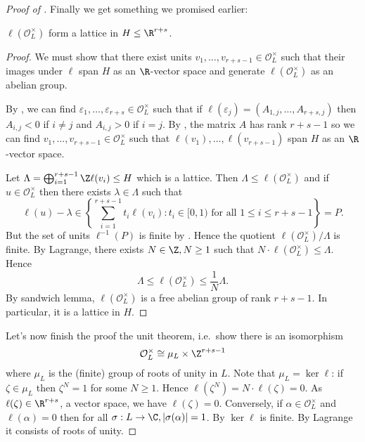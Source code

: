 \documentclass[a4paper]{article}
\renewcommand*{\O}{\mathcal{O}}
\begin{document}
\begin{proof}[Proof of ]
  Finally we get something we promised earlier:

  \begin{proposition}
    \(\ell(\O_L^\times)\) form a lattice in \(H \leq \R^{r + s}\).
  \end{proposition}

  \begin{proof}
    We must show that there exist units \(v_1, \dots, v_{r + s - 1} \in \O_L^\times\) such that their images under \(\ell\) span \(H\) as an \(\R\)-vector space and generate \(\ell(\O_L^\times)\) as an abelian group.

    By , we can find \(\varepsilon_1, \dots, \varepsilon_{r + s} \in \O_L^\times\) such that if \(\ell(\varepsilon_j) = (A_{1, j}, \dots, A_{r + s, j})\) then \(A_{i, j} < 0\) if \(i \neq j\) and \(A_{i, j} > 0\) if \(i = j\). By , the matrix \(A\) has rank \(r + s - 1\) so we can find \(v_1, \dots, v_{r + s - 1} \in \O_L^\times\) such that \(\ell(v_1), \dots, \ell(v_{r + s - 1})\) span \(H\) as an \(\R\)-vector space.

    Let \(\Lambda = \bigoplus_{i = 1}^{r + s - 1} \Z \ell(v_i) \leq H\) which is a lattice. Then \(\Lambda \leq \ell(\O_L^\times)\) and if \(u \in \O_L^\times\) then there exists \(\lambda \in \Lambda\) such that
    \[
      \ell(u) - \lambda \in \left\{ \sum_{i = 1}^{r + s - 1} t_i \ell(v_i): t_i \in [0, 1) \text{ for all } 1 \leq i \leq r + s - 1 \right\} = P.
    \]
    But the set of units \(\ell^{-1}(P)\) is finite by . Hence the quotient \(\ell(\O_L^\times)/\Lambda\) is finite. By Lagrange, there exists \(N \in \Z, N \geq 1\) such that \(N \cdot \ell(\O_L^\times) \leq \Lambda\). Hence
    \[
      \Lambda \leq \ell(\O_L^\times) \leq \frac{1}{N} \Lambda.
    \]
    By sandwich lemma, \(\ell(\O_L^\times)\) is a free abelian group of rank \(r + s - 1\). In particular, it is a lattice in \(H\).
  \end{proof}

  Let's now finish the proof the unit theorem, i.e.\ show there is an isomorphism
  \[
    \O_L^\times \cong \mu_L \times \Z^{r + s - 1}
  \]
  where \(\mu_L\) is the (finite) group of roots of unity in \(L\). Note that \(\mu_L = \ker \ell\): if \(\zeta \in \mu_L\) then \(\zeta^N = 1\) for some \(N \geq 1\). Hence \(\ell(\zeta^N) = N\cdot \ell(\zeta) = 0\). As \(\ell(\zeta) \in \R^{r + s}\), a vector space, we have \(\ell(\zeta) = 0\). Conversely, if \(\alpha \in \O_L^\times\) and \(\ell(\alpha) = 0\) then for all \(\sigma: L \to \C, |\sigma(\alpha)| = 1\). By  \(\ker \ell\) is finite. By Lagrange it consists of roots of unity.


\end{proof}
\end{document}
